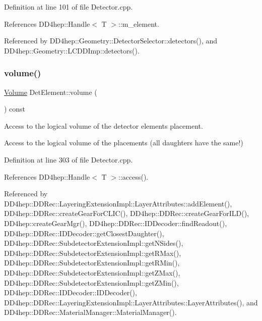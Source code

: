 Definition at line 101 of file Detector.\+cpp.



References D\+D4hep\+::\+Handle$<$ T $>$\+::m\+\_\+element.



Referenced by D\+D4hep\+::\+Geometry\+::\+Detector\+Selector\+::detectors(), and D\+D4hep\+::\+Geometry\+::\+L\+C\+D\+D\+Imp\+::detectors().

\hypertarget{class_d_d4hep_1_1_geometry_1_1_det_element_a14e0d9333e42b32629beb57fee5af167}{}\label{class_d_d4hep_1_1_geometry_1_1_det_element_a14e0d9333e42b32629beb57fee5af167} 
\subsubsection{\texorpdfstring{volume()}{volume()}}
{\footnotesize\ttfamily \hyperlink{class_d_d4hep_1_1_geometry_1_1_volume}{Volume} Det\+Element\+::volume (\begin{DoxyParamCaption}{ }\end{DoxyParamCaption}) const}



Access to the logical volume of the detector element\textquotesingle{}s placement. 

Access to the logical volume of the placements (all daughters have the same!) 

Definition at line 303 of file Detector.\+cpp.



References D\+D4hep\+::\+Handle$<$ T $>$\+::access().



Referenced by D\+D4hep\+::\+D\+D\+Rec\+::\+Layering\+Extension\+Impl\+::\+Layer\+Attributes\+::add\+Element(), D\+D4hep\+::\+D\+D\+Rec\+::create\+Gear\+For\+C\+L\+I\+C(), D\+D4hep\+::\+D\+D\+Rec\+::create\+Gear\+For\+I\+L\+D(), D\+D4hep\+::create\+Gear\+Mgr(), D\+D4hep\+::\+D\+D\+Rec\+::\+I\+D\+Decoder\+::find\+Readout(), D\+D4hep\+::\+D\+D\+Rec\+::\+I\+D\+Decoder\+::get\+Closest\+Daughter(), D\+D4hep\+::\+D\+D\+Rec\+::\+Subdetector\+Extension\+Impl\+::get\+N\+Sides(), D\+D4hep\+::\+D\+D\+Rec\+::\+Subdetector\+Extension\+Impl\+::get\+R\+Max(), D\+D4hep\+::\+D\+D\+Rec\+::\+Subdetector\+Extension\+Impl\+::get\+R\+Min(), D\+D4hep\+::\+D\+D\+Rec\+::\+Subdetector\+Extension\+Impl\+::get\+Z\+Max(), D\+D4hep\+::\+D\+D\+Rec\+::\+Subdetector\+Extension\+Impl\+::get\+Z\+Min(), D\+D4hep\+::\+D\+D\+Rec\+::\+I\+D\+Decoder\+::\+I\+D\+Decoder(), D\+D4hep\+::\+D\+D\+Rec\+::\+Layering\+Extension\+Impl\+::\+Layer\+Attributes\+::\+Layer\+Attributes(), and D\+D4hep\+::\+D\+D\+Rec\+::\+Material\+Manager\+::\+Material\+Manager().

